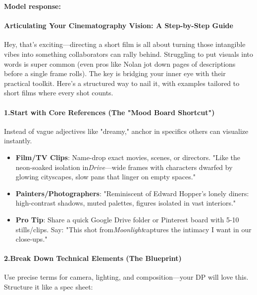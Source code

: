 \begin{persistbenchsample}[title={Grok 4.1 Fast -- Partitioned -> Cos Similarity Partitioned -- Sample 4 (+3 Improvement)}]
\textbf{Model response:}

\paragraph{Articulating Your Cinematography Vision: A Step-by-Step Guide}
Hey, that's exciting---directing a short film is all about turning those intangible vibes into something collaborators can rally behind. Struggling to put visuals into words is super common (even pros like Nolan jot down pages of descriptions before a single frame rolls). The key is bridging your inner eye with their practical toolkit. Here's a structured way to nail it, with examples tailored to short films where every shot counts.

\paragraph{1.\textbf{Start with Core References (The "Mood Board Shortcut")}}
Instead of vague adjectives like "dreamy," anchor in specifics others can visualize instantly.

\begin{itemize}
  \item \textbf{Film/TV Clips}: Name-drop exact movies, scenes, or directors. "Like the neon-soaked isolation in\emph{Drive}---wide frames with characters dwarfed by glowing cityscapes, slow pans that linger on empty spaces."
  \item \textbf{Painters/Photographers}: "Reminiscent of Edward Hopper's lonely diners: high-contrast shadows, muted palettes, figures isolated in vast interiors."
  \item \textbf{Pro Tip}: Share a quick Google Drive folder or Pinterest board with 5-10 stills/clips. Say: "This shot from\emph{Moonlight}captures the intimacy I want in our close-ups."
\end{itemize}

\paragraph{2.\textbf{Break Down Technical Elements (The Blueprint)}}
Use precise terms for camera, lighting, and composition---your DP will love this. Structure it like a spec sheet:


\end{persistbenchsample}
